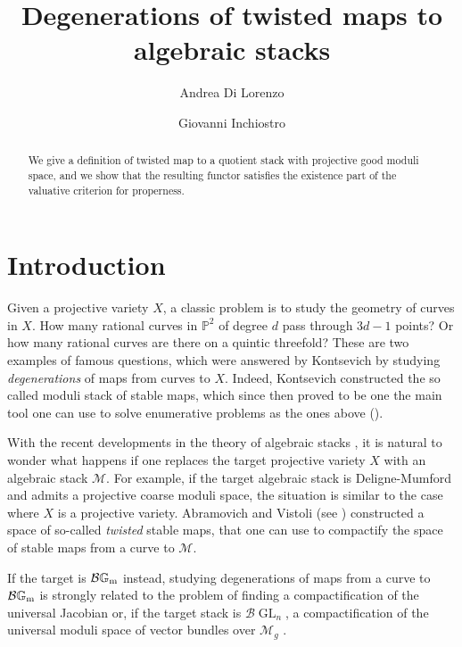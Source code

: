 \documentclass{amsart}
\newcommand{\bG}{\mathbb{G}}
\newcommand{\bP}{\mathbb{P}}
\newcommand{\cB}{\mathcal{B}}
\newcommand{\cM}{\mathcal{M}}
\newcommand{\Gm}{\bG_{{\rm m}}}
\newcommand{\GL}{\operatorname{GL}}
\theoremstyle{definition}
\begin{document}
\title[Degenerations of twisted maps to algebraic stacks]{Degenerations of twisted maps to algebraic stacks}
	\author[A. Di Lorenzo]{Andrea Di Lorenzo}
	\address[A. Di Lorenzo]{Humboldt Universit\"{a}t zu Berlin, Germany}
	\author[G. Inchiostro]{Giovanni Inchiostro}
	\address[G. Inchiostro]{University of Washington, Seattle, WA}
	\maketitle
	\begin{abstract}
		We give a definition of twisted map to a quotient stack with projective good moduli space, and we show that the resulting functor satisfies the existence part of the valuative criterion for properness.
	\end{abstract}
\section{Introduction}
Given a projective variety $X$, a classic problem is to study the geometry of curves in $X$. How many rational curves in $\bP^2$ of degree $d$ pass through $3d-1$ points? Or how many rational curves are there on a quintic threefold? These are two examples of famous questions, which were answered by Kontsevich \cite{Kon} by studying \textit{degenerations} of maps from curves to $X$. Indeed, Kontsevich constructed the so called moduli stack of stable maps, which since then proved to be one the main tool one can use to solve enumerative problems as the ones above (\cites{Kon, FP}).

With the recent developments in the theory of algebraic stacks \cites{Alp, halpner, AHH, luna}, it is natural to wonder what happens if one replaces the target projective variety $X$ with an algebraic stack $\cM$. For example, if the target algebraic stack is Deligne-Mumford and admits a projective coarse moduli space, the situation is similar to the case where $X$ is a projective variety. Abramovich and Vistoli (see \cites{AV_compactifying, ACV, AOV}) constructed a
space of so-called \emph{twisted} stable maps, that one can use to compactify the space of stable maps from a curve to $\cM$.

If the target is $\cB\Gm$ instead, studying degenerations of maps from a curve to $\cB\Gm$ is strongly related to the problem of finding a compactification of the universal Jacobian \cite{Cap} or, if the target stack is $\cB\GL_n$, a compactification of the universal moduli space of vector bundles over $\cM_{g}$ \cite{Pand}.
\end{document}
